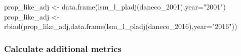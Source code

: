\documentclass[
]{article}
\newenvironment{Shaded}{\begin{snugshade}}{\end{snugshade}}
\newcommand{\AttributeTok}[1]{\textcolor[rgb]{0.77,0.63,0.00}{#1}}
\newcommand{\FunctionTok}[1]{\textcolor[rgb]{0.00,0.00,0.00}{#1}}
\newcommand{\NormalTok}[1]{#1}
\newcommand{\OtherTok}[1]{\textcolor[rgb]{0.56,0.35,0.01}{#1}}
\newcommand{\StringTok}[1]{\textcolor[rgb]{0.31,0.60,0.02}{#1}}
\begin{document}
\begin{Shaded}
\begin{Highlighting}[]
\NormalTok{prop\_like\_adj }\OtherTok{\textless{}{-}} \FunctionTok{data.frame}\NormalTok{(}\FunctionTok{lsm\_l\_pladj}\NormalTok{(daneco\_2001),}\AttributeTok{year=}\StringTok{"2001"}\NormalTok{)}
\NormalTok{prop\_like\_adj }\OtherTok{\textless{}{-}} \FunctionTok{rbind}\NormalTok{(prop\_like\_adj,}\FunctionTok{data.frame}\NormalTok{(}\FunctionTok{lsm\_l\_pladj}\NormalTok{(daneco\_2016),}\AttributeTok{year=}\StringTok{"2016"}\NormalTok{))}
\end{Highlighting}
\end{Shaded}

\hypertarget{calculate-additional-metrics}{%
\subsubsection{Calculate additional
metrics}\label{calculate-additional-metrics}}
\end{document}
